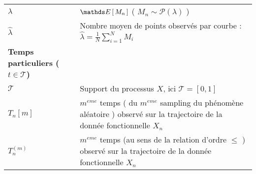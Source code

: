 \begin{table}[H]
\begin{tabularx}{\textwidth}{lX}
		\midrule
		$\lambda$                                                                                       & $\esperance{M_n}$ ( $M_n \sim \mathcal P(\lambda)$ )                                                                                                                                                                                                                                                                                        \\
		$\widehat \lambda$                                                                              & Nombre moyen de points observés par courbe : $\widehat \lambda = \frac 1 N \sum\limits_{i=1}^N M_i$																																																										  \\
		\midrule
		\textbf{Temps particuliers ($t \in \mathcal T$)}                                                &                                                                                                                                                                                                                                                                                                                                             \\
		\midrule
		$\mathcal T$                                                                                    & Support du processus $X$, ici $\mathcal T = [0,1]$                                                                                                                                                                                                                                                                                          \\
		$T_n[m]$                                                                                        & $m^{eme}$ temps ( du $m^{eme}$ sampling du phénomène aléatoire ) observé sur la trajectoire de la donnée fonctionnelle $X_n$                                                                                                                                                                                                                \\
		$T_n^{(m)}$                                                                                     & $m^{eme}$ temps (au sens de la relation d'ordre $\leq$ ) observé sur la trajectoire de la donnée fonctionnelle $X_n$                                                                                                                                                                                                                        \\

\end{tabularx}
\end{table}
